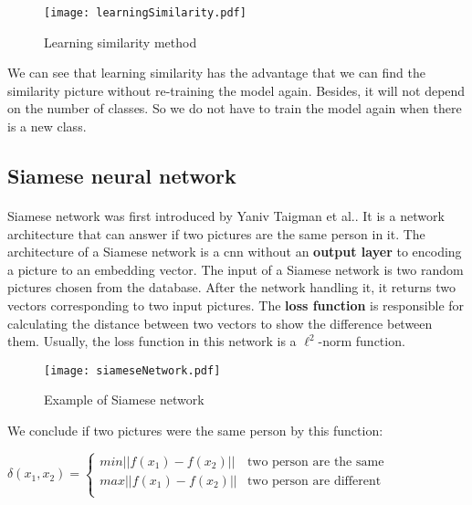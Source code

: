 \begin{figure}[H]
    \centering
    \texttt{[image: learningSimilarity.pdf]}
    \caption{Learning similarity method}
    \label{fig:learnSimilar}
\end{figure}

We can see that learning similarity has the advantage that we can find the similarity picture without re-training the model again. Besides, it will not depend on the number of classes. So we do not have to train the model again when there is a new class. 

\subsection{Siamese neural network}
\label{sec:siamese}
\paragraph{}
Siamese network was first introduced by Yaniv Taigman et al.\cite{inproceedings}. It is a network architecture that can answer if two pictures are the same person in it. The architecture of a Siamese network is a \acrlong{cnn} without an \textbf{output layer} to encoding a picture to an embedding vector. The input of a Siamese network is two random pictures chosen from the database. After the network handling it, it returns two vectors corresponding to two input pictures. The \textbf{loss function} is responsible for calculating the distance between two vectors to show the difference between them. Usually, the loss function in this network is a $\ell^2$-norm function.

\begin{figure}[H]
    \centering
    \texttt{[image: siameseNetwork.pdf]}
    \caption{Example of Siamese network}
    \label{fig:siameseNet}
\end{figure}

We conclude if two pictures were the same person by this function:

\begin{center}
    $
    \delta(x_1,x_2) = 
    \begin{cases}
        min ||f(x_1)- f(x_2)|| & \text{two person are the same} \\
        max ||f(x_1)- f(x_2)|| & \text{two person are different} \\
    \end{cases}
    $
\end{center}

